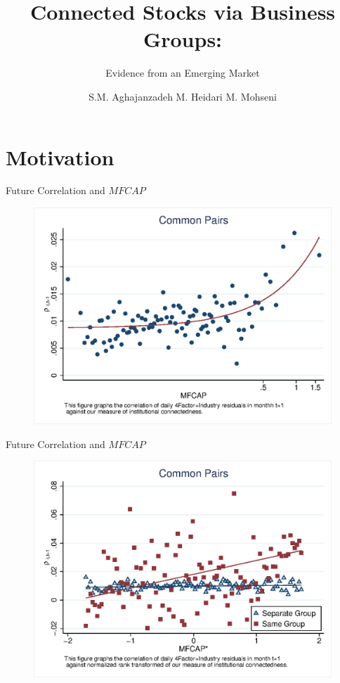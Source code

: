 \documentclass[handout]{beamer}
\title[Connected Stocks  via Business Groups]{Connected Stocks via Business Groups:}
\subtitle{Evidence from an Emerging Market}
\author[Aghajanzadeh, Heidari \& Mohseni]{S.M. Aghajanzadeh \qquad M. Heidari \qquad M. Mohseni }
\institute[TeIAS]{Tehran Institute for Advanced Studies }
\begin{document}
	\maketitle
	
	
	
	\section{Motivation}
	
	\begin{frame}{Future Correlation and $ MFCAP $}
		\begin{figure}
			\centering  
			\includegraphics[width=0.85\linewidth]{"Output/mcorr50.eps"}
		\end{figure}
	\end{frame}   
	
		\begin{frame}{Future Correlation and $ MFCAP $}
			\begin{figure}
				\centering  
				\includegraphics[width=0.85\linewidth]{"Output/mcorr5bg.eps"}
			\end{figure}
		\end{frame}   
	
\end{document}
